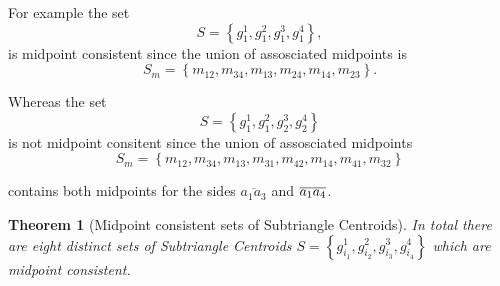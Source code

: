 \documentclass{unswthesis}
\newtheorem{theorem}{Theorem}
\begin{document}
For example the set%
\begin{equation*}
S=\left\{ g_{1}^{1},g_{1}^{2},g_{1}^{3},g_{1}^{4}\right\} ,
\end{equation*}%
is midpoint consistent since the union of assosciated midpoints is%
\begin{equation*}
S_{m}=\left\{ m_{12},m_{34},m_{13},m_{24},m_{14},m_{23}\right\} .
\end{equation*}

Whereas the set%
\begin{equation*}
S=\left\{ g_{1}^{1},g_{1}^{2},g_{2}^{3},g_{2}^{4}\right\} 
\end{equation*}%
is not midpoint consitent since the union of assosciated midpoints%
\begin{equation*}
S_{m}=\left\{
m_{12},m_{34},m_{13},m_{31},m_{42},m_{14},m_{41},m_{32}\right\} 
\end{equation*}

contains both midpoints for the sides $\overline{a_{1}a_{3}}$ and $\overline{%
a_{1}a_{4}}$.

\begin{theorem}[Midpoint consistent sets of Subtriangle Centroids]
In total there are eight distinct sets of Subtriangle Centroids $S=\left\{
g_{i_{1}}^{1},g_{i_{2}}^{2},g_{i_{3}}^{3},g_{i_{4}}^{4}\right\} $ which are
midpoint consistent.
\end{theorem}
\end{document}
